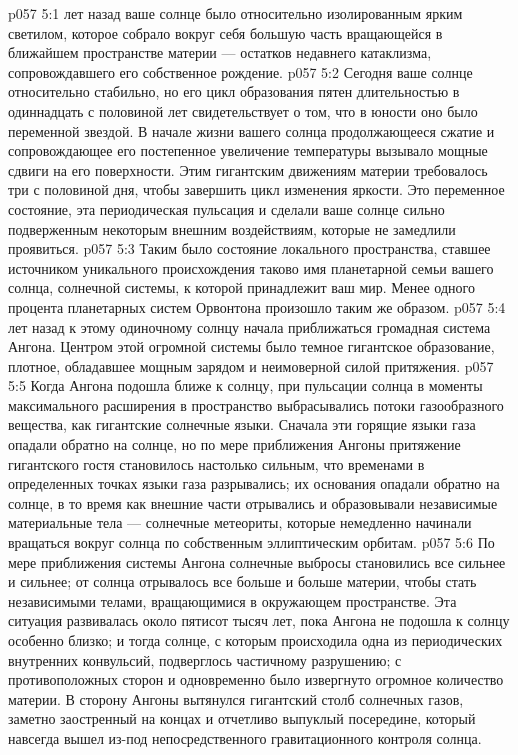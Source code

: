 \vs p057 5:1  лет назад ваше солнце было относительно изолированным ярким светилом, которое собрало вокруг себя большую часть вращающейся в ближайшем пространстве материи --- остатков недавнего катаклизма, сопровождавшего его собственное рождение.
\vs p057 5:2 Сегодня ваше солнце относительно стабильно, но его цикл образования пятен длительностью в одиннадцать с половиной лет свидетельствует о том, что в юности оно было переменной звездой. В начале жизни вашего солнца продолжающееся сжатие и сопровождающее его постепенное увеличение температуры вызывало мощные сдвиги на его поверхности. Этим гигантским движениям материи требовалось три с половиной дня, чтобы завершить цикл изменения яркости. Это переменное состояние, эта периодическая пульсация и сделали ваше солнце сильно подверженным некоторым внешним воздействиям, которые не замедлили проявиться.
\vs p057 5:3 Таким было состояние локального пространства, ставшее источником уникального происхождения  таково имя планетарной семьи вашего солнца, солнечной системы, к которой принадлежит ваш мир. Менее одного процента планетарных систем Орвонтона произошло таким же образом.
\vs p057 5:4 \pc {} лет назад к этому одиночному солнцу начала приближаться громадная система Ангона. Центром этой огромной системы было темное гигантское образование, плотное, обладавшее мощным зарядом и неимоверной силой притяжения.
\vs p057 5:5 Когда Ангона подошла ближе к солнцу, при пульсации солнца в моменты максимального расширения в пространство выбрасывались потоки газообразного вещества, как гигантские солнечные языки. Сначала эти горящие языки газа опадали обратно на солнце, но по мере приближения Ангоны притяжение гигантского гостя становилось настолько сильным, что временами в определенных точках языки газа разрывались; их основания опадали обратно на солнце, в то время как внешние части отрывались и образовывали независимые материальные тела --- солнечные метеориты, которые немедленно начинали вращаться вокруг солнца по собственным эллиптическим орбитам.
\vs p057 5:6 По мере приближения системы Ангона солнечные выбросы становились все сильнее и сильнее; от солнца отрывалось все больше и больше материи, чтобы стать независимыми телами, вращающимися в окружающем пространстве. Эта ситуация развивалась около пятисот тысяч лет, пока Ангона не подошла к солнцу особенно близко; и тогда солнце, с которым происходила одна из периодических внутренних конвульсий, подверглось частичному разрушению; с противоположных сторон и одновременно было извергнуто огромное количество материи. В сторону Ангоны вытянулся гигантский столб солнечных газов, заметно заостренный на концах и отчетливо выпуклый посередине, который навсегда вышел из\hyp{}под непосредственного гравитационного контроля солнца.
